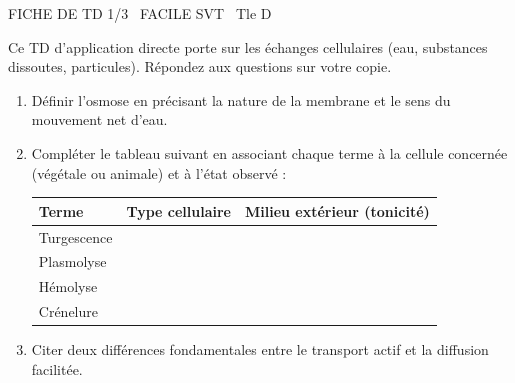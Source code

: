 \documentclass[11pt]{article}
\begin{document}
\begin{tcolorbox}[enhanced,colback=popink,colframe=popink,arc=10pt,boxrule=0pt,left=12pt,right=12pt,top=9pt,bottom=9pt]
{\color{white}\popxbold\small FICHE DE TD 1/3 \textbullet\ FACILE \hfill SVT \textbullet\ Tle D\par}
\end{tcolorbox}
\vspace{4pt}
Ce TD d'application directe porte sur les échanges cellulaires (eau, substances dissoutes, particules). Répondez aux questions sur votre copie.

\begin{exercice}
\begin{enumerate}
    \item Définir l'osmose en précisant la nature de la membrane et le sens du mouvement net d'eau.
    \item Compléter le tableau suivant en associant chaque terme à la cellule concernée (végétale ou animale) et à l'état observé :
    \begin{tabular}{|l|c|c|}
    \hline
    Terme & Type cellulaire & Milieu extérieur (tonicité) \\
    \hline
    Turgescence & & \\
    Plasmolyse & & \\
    Hémolyse & & \\
    Crénelure & & \\
    \hline
    \end{tabular}
    \item Citer deux différences fondamentales entre le transport actif et la diffusion facilitée.
\end{enumerate}
\end{exercice}
\end{document}
